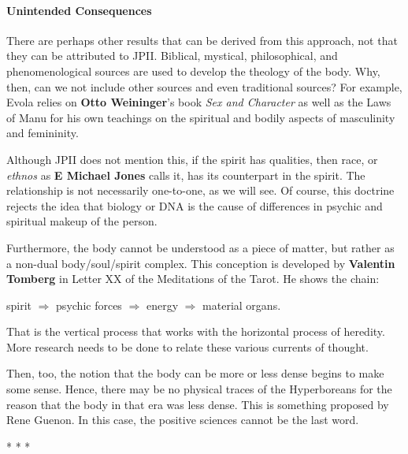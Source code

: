 \paragraph{Unintended Consequences}


There are perhaps other results that can be derived from this approach, not that they can be attributed to JPII. Biblical, mystical, philosophical, and phenomenological sources are used to develop the theology of the body. Why, then, can we not include other sources and even traditional sources? For example, Evola relies on \textbf{Otto Weininger}'s book \textit{Sex and Character} as well as the Laws of Manu for his own teachings on the spiritual and bodily aspects of masculinity and femininity.

Although JPII does not mention this, if the spirit has qualities, then race, or \emph{ethnos} as \textbf{E Michael Jones} calls it, has its counterpart in the spirit. The relationship is not necessarily one-to-one, as we will see. Of course, this doctrine rejects the idea that biology or DNA is the cause of differences in psychic and spiritual makeup of the person.

Furthermore, the body cannot be understood as a piece of matter, but rather as a non-dual body/soul/spirit complex. This conception is developed by \textbf{Valentin Tomberg} in Letter XX of the Meditations of the Tarot. He shows the chain:

spirit $\Rightarrow$ psychic forces $\Rightarrow$ energy $\Rightarrow$ material organs.

That is the vertical process that works with the horizontal process of heredity. More research needs to be done to relate these various currents of thought.

Then, too, the notion that the body can be more or less dense begins to make some sense. Hence, there may be no physical traces of the Hyperboreans for the reason that the body in that era was less dense. This is something proposed by Rene Guenon. In this case, the positive sciences cannot be the last word.



\begin{center}* * *\end{center}

